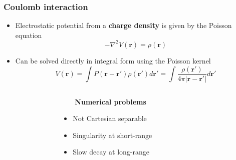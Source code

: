 \begin{frame}
    \frametitle{Coulomb interaction}
    \scriptsize
    \begin{itemize}
	\item	Electrostatic potential from a \textbf{charge density} is given by the Poisson equation
		\begin{equation}
		    \nonumber
		    -\nabla^2 V(\boldsymbol{r}) = \rho(\boldsymbol{r})
		\end{equation}
		\vspace{2mm}
	\item	Can be solved directly in integral form using the Poisson kernel
		\begin{equation}
		    \nonumber
		    V(\boldsymbol{r}) = 
		    \int P(\boldsymbol{r}-\boldsymbol{r'})\rho(\boldsymbol{r'}) d\boldsymbol{r'} =
		    \int\frac{\rho(\boldsymbol{r'})}{4\pi|\boldsymbol{r} - \boldsymbol{r'}|} d\boldsymbol{r'} 
		\end{equation}
		\vspace{2mm}
    \end{itemize}
    \pause
    \begin{columns}
    \begin{column}{.30\textwidth}
    \end{column}
    \begin{column}{.40\textwidth}
        \ \ \ \ \textbf{Numerical problems}
        \begin{itemize}
	    \item Not Cartesian separable
	    \item Singularity at short-range
	    \item Slow decay at long-range
	\end{itemize}
    \end{column}
    \begin{column}{.30\textwidth}
    \end{column}
    \end{columns}
\end{frame}

